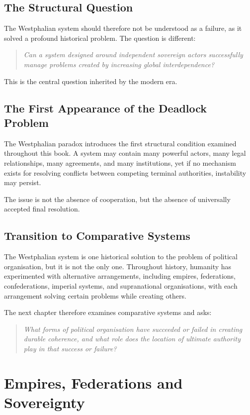 \documentclass[11pt,openany]{book}
\theoremstyle{plain}
\theoremstyle{definition}
\begin{document}
\section*{The Structural Question}

The Westphalian system should therefore not be understood as a failure, as it solved a profound historical problem. The question is different:
\begin{quote}
\textit{Can a system designed around independent sovereign actors successfully manage problems created by increasing global interdependence?}
\end{quote}

This is the central question inherited by the modern era.

\section*{The First Appearance of the Deadlock Problem}

The Westphalian paradox introduces the first structural condition examined throughout this book. A system may contain many powerful actors, many legal relationships, many agreements, and many institutions, yet if no mechanism exists for resolving conflicts between competing terminal authorities, instability may persist.

The issue is not the absence of cooperation, but the absence of universally accepted final resolution.

\section*{Transition to Comparative Systems}

The Westphalian system is one historical solution to the problem of political organisation, but it is not the only one. Throughout history, humanity has experimented with alternative arrangements, including empires, federations, confederations, imperial systems, and supranational organisations, with each arrangement solving certain problems while creating others.

The next chapter therefore examines comparative systems and asks:
\begin{quote}
\textit{What forms of political organisation have succeeded or failed in creating durable coherence, and what role does the location of ultimate authority play in that success or failure?}
\end{quote}

\chapter{Empires, Federations and Sovereignty}
\end{document}
